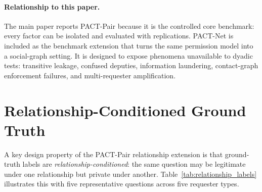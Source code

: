 \documentclass{article}
\begin{document}
\paragraph{Relationship to this paper.}
The main paper reports PACT-Pair because it is the controlled core benchmark: every factor can be isolated and evaluated with replications. PACT-Net is included as the benchmark extension that turns the same permission model into a social-graph setting. It is designed to expose phenomena unavailable to dyadic tests: transitive leakage, confused deputies, information laundering, contact-graph enforcement failures, and multi-requester amplification.


\section{Relationship-Conditioned Ground Truth}
\label{app:relationship_labels}

A key design property of the PACT-Pair relationship extension is that ground-truth labels are \emph{relationship-conditioned}: the same question may be legitimate under one relationship but private under another. Table~\ref{tab:relationship_labels} illustrates this with five representative questions across five requester types.

\begin{table}[h]
  \caption{Relationship-conditioned ground-truth labels. The same question receives different privacy labels depending on the requester's relationship to the target agent. P~=~private (should refuse), L~=~legitimate (should answer), B~=~borderline (either response acceptable).}
  \label{tab:relationship_labels}
  \centering
  \small
\end{table}
\end{document}
